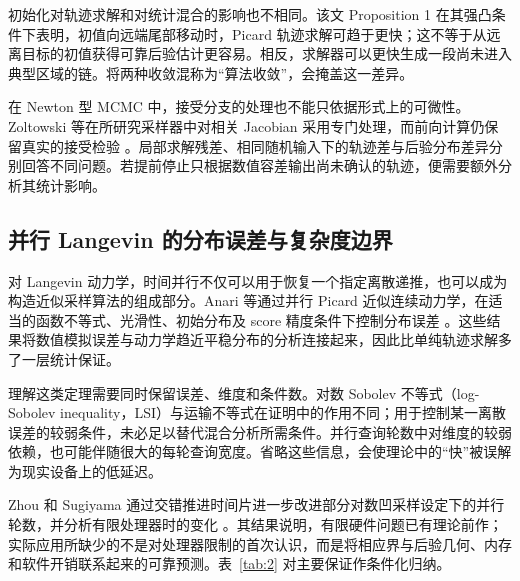 \documentclass[UTF8,a4paper,zihao=-4,fontset=fandol]{ctexart}
\begin{document}
初始化对轨迹求解和对统计混合的影响也不相同。该文 Proposition 1 在其强凸条件下表明，初值向远端尾部移动时，Picard 轨迹求解可趋于更快；这不等于从远离目标的初值获得可靠后验估计更容易。相反，求解器可以更快生成一段尚未进入典型区域的链。将两种收敛混称为“算法收敛”，会掩盖这一差异。

在 Newton 型 MCMC 中，接受分支的处理也不能只依据形式上的可微性。Zoltowski 等在所研究采样器中对相关 Jacobian 采用专门处理，而前向计算仍保留真实的接受检验 \cite{zoltowski2025}。局部求解残差、相同随机输入下的轨迹差与后验分布差异分别回答不同问题。若提前停止只根据数值容差输出尚未确认的轨迹，便需要额外分析其统计影响。

\subsection{并行 Langevin 的分布误差与复杂度边界}

对 Langevin 动力学，时间并行不仅可以用于恢复一个指定离散递推，也可以成为构造近似采样算法的组成部分。Anari 等通过并行 Picard 近似连续动力学，在适当的函数不等式、光滑性、初始分布及 score 精度条件下控制分布误差 \cite{anari2024}。这些结果将数值模拟误差与动力学趋近平稳分布的分析连接起来，因此比单纯轨迹求解多了一层统计保证。

理解这类定理需要同时保留误差、维度和条件数。对数 Sobolev 不等式（log-Sobolev inequality，LSI）与运输不等式在证明中的作用不同；用于控制某一离散误差的较弱条件，未必足以替代混合分析所需条件。并行查询轮数中对维度的较弱依赖，也可能伴随很大的每轮查询宽度。省略这些信息，会使理论中的“快”被误解为现实设备上的低延迟。

Zhou 和 Sugiyama 通过交错推进时间片进一步改进部分对数凹采样设定下的并行轮数，并分析有限处理器时的变化 \cite{zhou2025parallel}。其结果说明，有限硬件问题已有理论前作；实际应用所缺少的不是对处理器限制的首次认识，而是将相应界与后验几何、内存和软件开销联系起来的可靠预测。表~\ref{tab:2} 对主要保证作条件化归纳。
\end{document}
